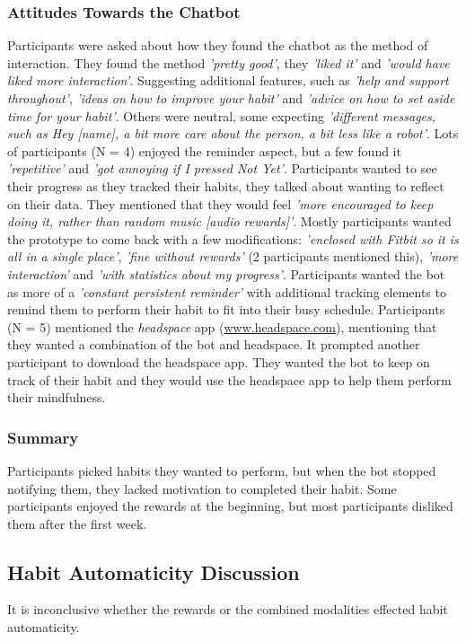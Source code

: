 \documentclass{scaffold/sigchi}
\begin{document}
\subsubsection{Attitudes Towards the Chatbot}
Participants were asked about how they found the chatbot as the method of interaction. They found the method \textit{'pretty good'}, they \textit{'liked it'} and \textit{'would have liked more interaction'}. Suggesting additional features, such as \textit{'help and support throughout'}, \textit{'ideas on how to improve your habit'} and \textit{'advice on how to set aside time for your habit'}. Others were neutral, some expecting \textit{'different messages, such as Hey [name], a bit more care about the person, a bit less like a robot'}. Lots of participants (N = 4) enjoyed the reminder aspect, but a few found it \textit{'repetitive'} and \textit{'got annoying if I pressed Not Yet'}. Participants wanted to see their progress as they tracked their habits, they talked about wanting to reflect on their data. They mentioned that they would feel \textit{'more encouraged to keep doing it, rather than random music [audio rewards]'}. Mostly participants wanted the prototype to come back with a few modifications: \textit{'enclosed with Fitbit so it is all in a single place'}, \textit{'fine without rewards'} (2 participants mentioned this), \textit{'more interaction'} and \textit{'with statistics about my progress'}. Participants wanted the bot as more of a \textit{'constant persistent reminder'} with additional tracking elements to remind them to perform their habit to fit into their busy schedule. Participants (N = 5) mentioned the \textit{headspace} app (\url{www.headspace.com}), mentioning that they wanted a combination of the bot and headspace. It prompted another participant to download the headspace app. They wanted the bot to keep on track of their habit and they would use the headspace app to help them perform their mindfulness.

\subsubsection{Summary}
Participants picked habits they wanted to perform, but when the bot stopped notifying them, they lacked motivation to completed their habit. Some participants enjoyed the rewards at the beginning, but most participants disliked them after the first week.

\subsection{Habit Automaticity Discussion}
It is inconclusive whether the rewards or the combined modalities effected habit automaticity. 
\end{document}
